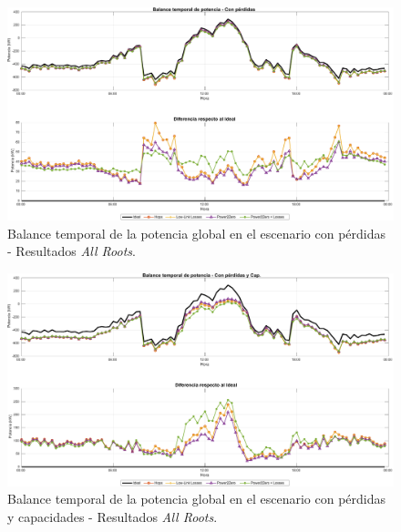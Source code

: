 \begin{figure}[ht!]
    \centering
    \includegraphics[width=\textwidth]{fig/07_bloste/bloste_14.pdf}
    \caption{Balance temporal de la potencia global en el escenario con pérdidas - Resultados \textit{All Roots}.}
    \label{fig:fig_fullrandom_TempPowerBalance_Lossy}
\end{figure}

\begin{figure}[ht!]
    \centering
    \includegraphics[width=\textwidth]{fig/07_bloste/bloste_15.pdf}
    \caption{Balance temporal de la potencia global en el escenario con pérdidas y capacidades - Resultados \textit{All Roots}.}
    \label{fig:fig_fullrandom_TempPowerBalance_LossyCap}
\end{figure}


